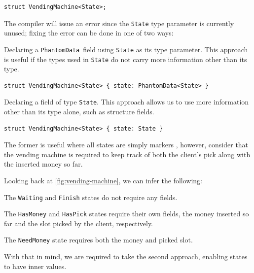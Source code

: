 \begin{verbatim}
struct VendingMachine<State>;
\end{verbatim}

The compiler will issue an error since the \texttt{State} type parameter is currently unused;
fixing the error can be done in one of two ways:
\begin{compactitem}
    \item Declaring a \texttt{PhantomData}\footnotemark~field using \texttt{State} as its type parameter.
    This approach is useful if the types used in \texttt{State} do not carry more information other than its type.
    \begin{verbatim}
struct VendingMachine<State> { state: PhantomData<State> }
    \end{verbatim}
    \item Declaring a field of type \texttt{State}.
    This approach allows us to use more information other than its type alone, such as structure fields.
    \begin{verbatim}
struct VendingMachine<State> { state: State }
    \end{verbatim}
\end{compactitem}

The former is useful where all states are simply markers ,
however, consider that the vending machine is required to keep track of both the client's pick along with the inserted money so far.

Looking back at \autoref{fig:vending-machine}, we can infer the following:
\begin{compactitem}
    \item The \texttt{Waiting} and \texttt{Finish} states do not require any fields.
    \item The \texttt{HasMoney} and \texttt{HasPick} states require their own fields,
    the money inserted so far and the slot picked by the client, respectively.
    \item The \texttt{NeedMoney} state requires both the money and picked slot.
\end{compactitem}
With that in mind, we are required to take the second approach, enabling states to have inner values.

